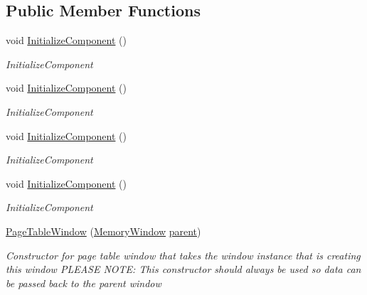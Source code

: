 \subsection*{Public Member Functions}
\begin{DoxyCompactItemize}
\item 
void \hyperlink{class_c_p_u___o_s___simulator_1_1_page_table_window_aac86b3b08e7e32708ac357042af6cbb2}{Initialize\+Component} ()
\begin{DoxyCompactList}\small\item\em Initialize\+Component \end{DoxyCompactList}\item 
void \hyperlink{class_c_p_u___o_s___simulator_1_1_page_table_window_aac86b3b08e7e32708ac357042af6cbb2}{Initialize\+Component} ()
\begin{DoxyCompactList}\small\item\em Initialize\+Component \end{DoxyCompactList}\item 
void \hyperlink{class_c_p_u___o_s___simulator_1_1_page_table_window_aac86b3b08e7e32708ac357042af6cbb2}{Initialize\+Component} ()
\begin{DoxyCompactList}\small\item\em Initialize\+Component \end{DoxyCompactList}\item 
void \hyperlink{class_c_p_u___o_s___simulator_1_1_page_table_window_aac86b3b08e7e32708ac357042af6cbb2}{Initialize\+Component} ()
\begin{DoxyCompactList}\small\item\em Initialize\+Component \end{DoxyCompactList}\item 
\hyperlink{class_c_p_u___o_s___simulator_1_1_page_table_window_a7d71ad4194ceafa3573e5f65e8dbe90a}{Page\+Table\+Window} (\hyperlink{class_c_p_u___o_s___simulator_1_1_memory_window}{Memory\+Window} \hyperlink{class_c_p_u___o_s___simulator_1_1_page_table_window_a1903e0b83820829549f74207cd209337}{parent})
\begin{DoxyCompactList}\small\item\em Constructor for page table window that takes the window instance that is creating this window P\+L\+E\+A\+S\+E N\+O\+T\+E\+: This constructor should always be used so data can be passed back to the parent window \end{DoxyCompactList}\end{DoxyCompactItemize}
